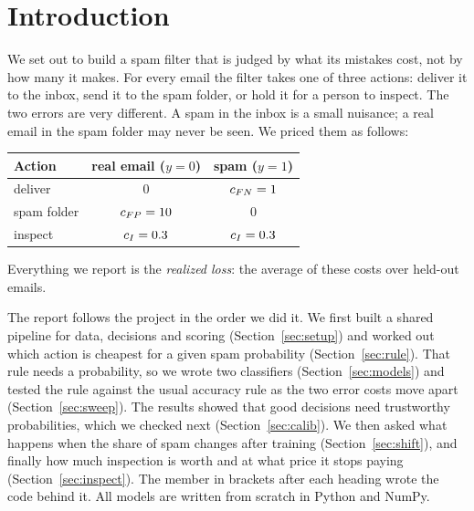 \section{Introduction}
\label{sec:intro}

We set out to build a spam filter that is judged by what its mistakes cost, not by how many it
makes. For every email the filter takes one of three actions: deliver it to the inbox, send it to the
spam folder, or hold it for a person to inspect. The two errors are very different. A spam in the
inbox is a small nuisance; a real email in the spam folder may never be seen. We priced them as
follows:
\begin{center}
\small
\begin{tabular}{lcc}
\toprule
Action & real email ($y=0$) & spam ($y=1$) \\
\midrule
deliver       & $0$           & $c_{FN}=1$ \\
spam folder   & $c_{FP}=10$     & $0$ \\
inspect       & $c_I=0.3$     & $c_I=0.3$ \\
\bottomrule
\end{tabular}
\end{center}
Everything we report is the \emph{realized loss}: the average of these costs over held-out emails.

The report follows the project in the order we did it. We first built a shared pipeline for data,
decisions and scoring (Section~\ref{sec:setup}) and worked out which action is cheapest for a given
spam probability (Section~\ref{sec:rule}). That rule needs a probability, so we wrote two classifiers
(Section~\ref{sec:models}) and tested the rule against the usual accuracy rule as the two error costs
move apart (Section~\ref{sec:sweep}). The results showed that good decisions need trustworthy
probabilities, which we checked next (Section~\ref{sec:calib}). We then asked what happens when the
share of spam changes after training (Section~\ref{sec:shift}), and finally how much inspection is
worth and at what price it stops paying (Section~\ref{sec:inspect}). The member in brackets after each
heading wrote the code behind it. All models are written from scratch in Python and NumPy.
